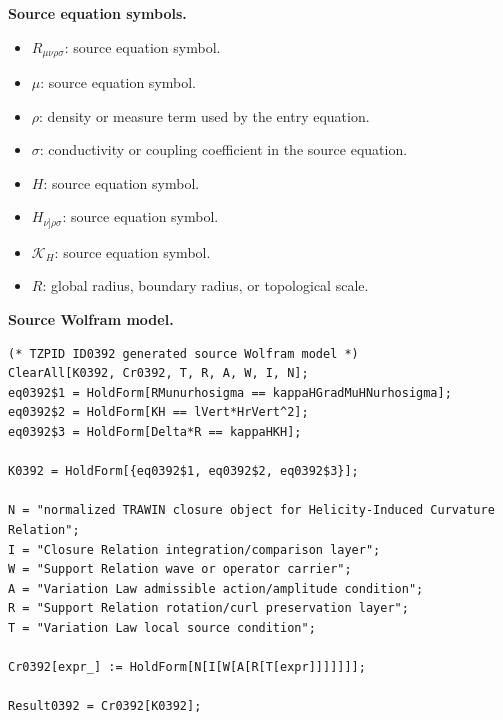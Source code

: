 \begin{minipage}[t]{0.49\linewidth}
\begingroup
\small
\raggedright
\textbf{Source equation symbols.}\par
\begin{itemize}[leftmargin=1.35em,itemsep=1pt,topsep=1pt,parsep=0pt]
    \item $R_{\mu\nu\rho\sigma}$: source equation symbol.
    \item $\mu$: source equation symbol.
    \item $\rho$: density or measure term used by the entry equation.
    \item $\sigma$: conductivity or coupling coefficient in the source equation.
    \item $H$: source equation symbol.
    \item $H_{\nu]\rho\sigma}$: source equation symbol.
    \item $\mathcal{K}_{H}$: source equation symbol.
    \item $R$: global radius, boundary radius, or topological scale.
\end{itemize}
\endgroup
\end{minipage}\hfill
\begin{minipage}[t]{0.47\linewidth}
\begingroup
\scriptsize
\raggedright
\textbf{Source Wolfram model.}\par
\begin{Verbatim}[fontsize=\tiny,breaklines=true,breakanywhere=true]
(* TZPID ID0392 generated source Wolfram model *)
ClearAll[K0392, Cr0392, T, R, A, W, I, N];
eq0392$1 = HoldForm[RMunurhosigma == kappaHGradMuHNurhosigma];
eq0392$2 = HoldForm[KH == lVert*HrVert^2];
eq0392$3 = HoldForm[Delta*R == kappaHKH];

K0392 = HoldForm[{eq0392$1, eq0392$2, eq0392$3}];

N = "normalized TRAWIN closure object for Helicity-Induced Curvature Relation";
I = "Closure Relation integration/comparison layer";
W = "Support Relation wave or operator carrier";
A = "Variation Law admissible action/amplitude condition";
R = "Support Relation rotation/curl preservation layer";
T = "Variation Law local source condition";

Cr0392[expr_] := HoldForm[N[I[W[A[R[T[expr]]]]]]];

Result0392 = Cr0392[K0392];
\end{Verbatim}
\endgroup
\end{minipage}

